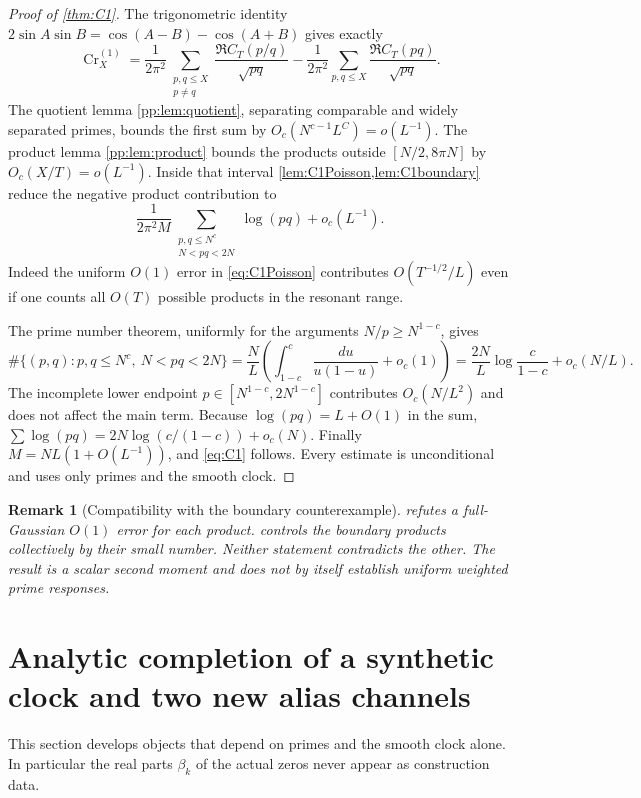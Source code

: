 \documentclass[11pt,reqno]{amsart}
\numberwithin{equation}{section}
\newtheorem{remark}[theorem]{Remark}
\newcommand{\N}{\mathbb N}
\begin{document}
\begin{proof}[Proof of \cref{thm:C1}]
The trigonometric identity $2\sin A\sin B=\cos(A-B)-\cos(A+B)$
gives exactly
\begin{equation}\label{eq:C1expand}
\operatorname{Cr}^{(1)}_X=\frac1{2\pi^2}
\sum_{\substack{p,q\le X\\p\ne q}}
\frac{\Re C_T(p/q)}{\sqrt{pq}}
-\frac1{2\pi^2}\sum_{p,q\le X}
\frac{\Re C_T(pq)}{\sqrt{pq}}.
\end{equation}
The quotient lemma \cref{pp:lem:quotient}, separating comparable
and widely separated primes, bounds the first sum by
$O_c(N^{c-1}L^C)=o(L^{-1})$. The product lemma
\cref{pp:lem:product} bounds the products outside
$[N/2,8\pi N]$ by $O_c(X/T)=o(L^{-1})$.
Inside that interval \cref{lem:C1Poisson,lem:C1boundary}
reduce the negative product contribution to
\begin{equation}\label{eq:C1countpre}
\frac1{2\pi^2 M}\sum_{\substack{p,q\le N^c\\N<pq<2N}}
\log(pq)+o_c(L^{-1}).
\end{equation}
Indeed the uniform $O(1)$ error in \eqref{eq:C1Poisson}
contributes $O(T^{-1/2}/L)$ even if one counts all $O(T)$
possible products in the resonant range.

The prime number theorem, uniformly for the arguments
$N/p\ge N^{1-c}$, gives
\[
\#\{(p,q):p,q\le N^c,\ N<pq<2N\}
=\frac{N}{L}\left(
\int_{1-c}^c\frac{du}{u(1-u)}+o_c(1)\right)
=\frac{2N}{L}\log\frac c{1-c}+o_c(N/L).
\]
The incomplete lower endpoint $p\in[N^{1-c},2N^{1-c}]$
contributes $O_c(N/L^2)$ and does not affect the main term.
Because $\log(pq)=L+O(1)$ in the sum,
$\sum\log(pq)=2N\log(c/(1-c))+o_c(N)$.
Finally $M=NL(1+O(L^{-1}))$, and \eqref{eq:C1}
follows. Every estimate is unconditional and uses only primes and
the smooth clock.
\end{proof}

\begin{remark}[Compatibility with the boundary counterexample]
\label{rem:C1withboundary}
 refutes a full-Gaussian $O(1)$ error
\emph{for each product}.  controls the boundary
products collectively by their small number. Neither statement
contradicts the other. The result is a scalar second moment and
does not by itself establish uniform weighted prime responses.
\end{remark}

\section{Analytic completion of a synthetic clock and two new alias channels}
\label{sec:analyticbridge}
This section develops objects that depend on primes and the smooth
clock alone. In particular the real parts $\beta_k$ of the actual
zeros never appear as construction data.
\end{document}
